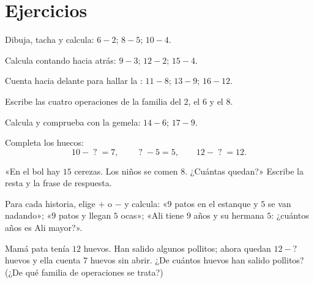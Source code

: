 \section{Ejercicios}

\begin{exercise}[$\star$]\label{exo:g1:subtraction:1}
Dibuja, tacha y calcula: $6 - 2$; \quad $8 - 5$; \quad
$10 - 4$.
\end{exercise}

\begin{exercise}[$\star$]\label{exo:g1:subtraction:2}
Calcula contando hacia atrás: $9 - 3$; \quad $12 - 2$; \quad
$15 - 4$.
\end{exercise}

\begin{exercise}[$\star$]\label{exo:g1:subtraction:3}
Cuenta hacia delante para hallar la : $11 - 8$; \quad $13 - 9$; \quad
$16 - 12$.
\end{exercise}

\begin{exercise}[$\star$]\label{exo:g1:subtraction:4}
Escribe las cuatro operaciones de la familia del $2$, el $6$ y el $8$.
\end{exercise}

\begin{exercise}[$\star$]\label{exo:g1:subtraction:5}
Calcula y comprueba con la  gemela: $14 - 6$; \quad
$17 - 9$.
\end{exercise}

\begin{exercise}[$\star$]\label{exo:g1:subtraction:6}
Completa los huecos:
\[
10 - \;?\; = 7, \qquad
\;?\; - 5 = 5, \qquad
12 - \;?\; = 12 .
\]
\end{exercise}

\begin{exercise}[$\star$]\label{exo:g1:subtraction:7}
«En el bol hay $15$ cerezas. Los niños se comen $8$. ¿Cuántas
quedan?» Escribe la resta y la frase de respuesta.
\end{exercise}

\begin{exercise}[$\star$]\label{exo:g1:subtraction:8}
Para cada historia, elige $+$ o $-$ y calcula: «$9$ patos en el
estanque y $5$ se van nadando»; «$9$ patos y llegan $5$ ocas»;
«Ali tiene $9$ años y su hermana $5$: ¿cuántos años es Ali mayor?».
\end{exercise}

\begin{exercise}[$\star\star$]\label{exo:g1:subtraction:9}
Mamá pata tenía $12$ huevos. Han salido algunos pollitos; ahora quedan
$12 - ?$ huevos y ella cuenta $7$ huevos sin abrir. ¿De cuántos huevos
han salido pollitos? (¿De qué familia de operaciones se trata?)
\end{exercise}
